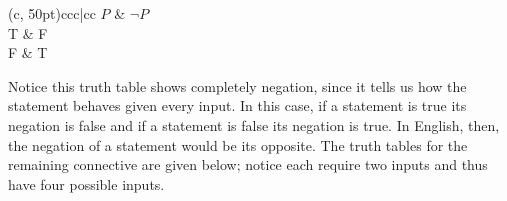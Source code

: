 \documentclass{report}
\begin{document}
\vspace{\baselineskip}
\begin{center}
	\begin{TAB}(c, 50pt){cc}{c|cc}
		$P$ & $\neg P$ \\
		T & F \\
		F & T \\
	\end{TAB}
\end{center}
\vspace{\baselineskip}

Notice this truth table shows completely negation, since it tells us how the statement behaves given every input. In this case, if a statement is true its negation is false and if a statement is false its negation is true. In English, then, the negation of a statement would be its opposite. The truth tables for the remaining connective are given below; notice each require two inputs and thus have four possible inputs.
\end{document}
